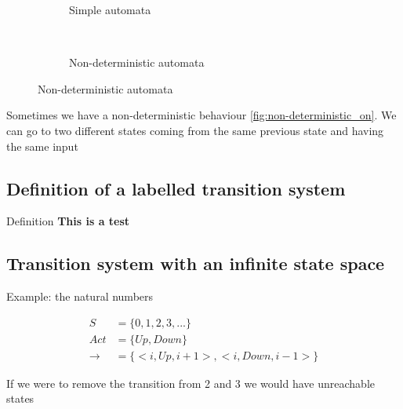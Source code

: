 \begin{figure}
  \centering
  \begin{subfigure}[b]{.45\textwidth}
    \centering

    \caption{Simple automata \label{fig:deterministic_on}}
  \end{subfigure}
  ~
  \begin{subfigure}[b]{.45\textwidth}
    \centering
    
    \caption{Non-deterministic automata \label{fig:non-deterministic_on}}
  \end{subfigure}
\end{figure}
Sometimes we have a non-deterministic behaviour \autoref{fig:non-deterministic_on}. We can go
to two different states coming from the same previous state and having the same input

\subsection{Definition of a labelled transition system}

Definition
\textbf{This is a test}


\subsection{Transition system with an infinite state space}

Example: the natural numbers

\begin{align*}
  S &= \{ 0, 1, 2, 3, ... \} \\
  Act &= \{ Up, Down \}  \\
  \rightarrow &= \{ <i, Up, i+1>, <i, Down, i-1> \}
\end{align*}

If we were to remove the transition from 2 and 3 we would have unreachable states



